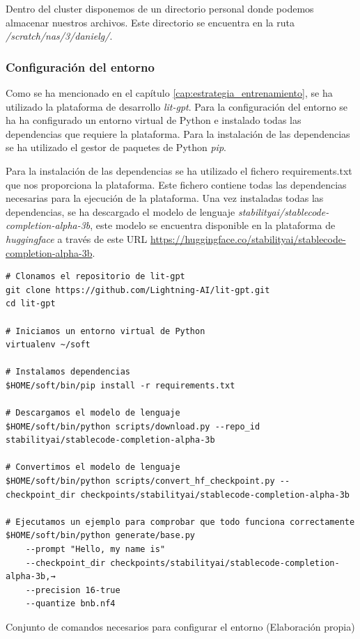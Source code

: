 Dentro del cluster disponemos de un directorio personal donde podemos almacenar nuestros
archivos. Este directorio se encuentra en la ruta \textit{/scratch/nas/3/danielg/}.

\subsubsection{Configuración del entorno}
\label{subsubsec:configuracion_entorno}


Como se ha mencionado en el capítulo \ref{cap:estrategia_entrenamiento}, se ha utilizado
la plataforma de desarrollo \textit{lit-gpt}. Para la configuración del entorno se ha
ha configurado un entorno virtual de Python e instalado todas las dependencias que requiere
la plataforma. Para la instalación de las dependencias se ha utilizado el gestor de paquetes
de Python \textit{pip}.

Para la instalación de las dependencias se ha utilizado el fichero requirements.txt que
nos proporciona la plataforma. Este fichero contiene todas las dependencias necesarias
para la ejecución de la plataforma. Una vez instaladas todas las dependencias, se
ha descargado el modelo de lenguaje \textit{stabilityai/stablecode-completion-alpha-3b}, este
modelo se encuentra disponible en la plataforma de \textit{huggingface} a través de este URL
\url{https://huggingface.co/stabilityai/stablecode-completion-alpha-3b}.

\begin{mycode}
    \begin{verbatim}
# Clonamos el repositorio de lit-gpt
git clone https://github.com/Lightning-AI/lit-gpt.git
cd lit-gpt

# Iniciamos un entorno virtual de Python
virtualenv ~/soft

# Instalamos dependencias
$HOME/soft/bin/pip install -r requirements.txt

# Descargamos el modelo de lenguaje
$HOME/soft/bin/python scripts/download.py --repo_id stabilityai/stablecode-completion-alpha-3b

# Convertimos el modelo de lenguaje
$HOME/soft/bin/python scripts/convert_hf_checkpoint.py --checkpoint_dir checkpoints/stabilityai/stablecode-completion-alpha-3b

# Ejecutamos un ejemplo para comprobar que todo funciona correctamente
$HOME/soft/bin/python generate/base.py
    --prompt "Hello, my name is"
    --checkpoint_dir checkpoints/stabilityai/stablecode-completion-alpha-3b,→
    --precision 16-true
    --quantize bnb.nf4
    \end{verbatim}
    \caption[Conjunto de comandos necesarios para configurar el entorno]{Conjunto de comandos necesarios para configurar el entorno (Elaboración propia)}
    \label{code:configuracion_entorno}
\end{mycode}


